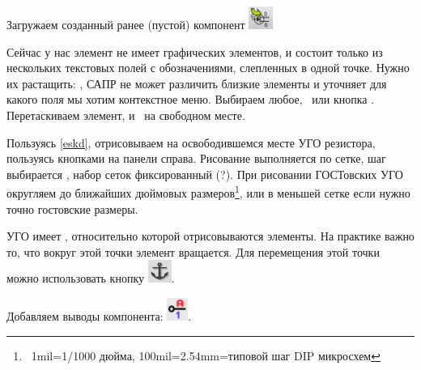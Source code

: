 Загружаем созданный ранее (пустой) компонент 
 \includegraphics[height=2em]{kicad/editel.png}


Сейчас у нас элемент не имеет графических элементов, и состоит только из
нескольких текстовых полей с обозначениями, слепленных в одной точке. Нужно их
растащить: \rms, САПР не может различить близкие элементы и уточняет для
какого поля мы хотим контекстное меню. Выбираем любое, \
или кнопка . Перетаскиваем элемент, и \lms\ на свободном месте.

Пользуясь \ref{eskd}, отрисовываем на освободившемся месте УГО резистора,
пользуясь кнопками на панели справа. Рисование выполняется по сетке, шаг
выбирается \menu{\rms>Выбор сетки}, набор сеток фиксированный (?). При рисовании
ГОСТовских УГО округляем до ближайших дюймовых размеров\footnote{\ 1mil=1/1000
дюйма, 100mil=2.54mm=типовой шаг DIP микросхем}, или в меньшей сетке если нужно
точно гостовские размеры.

УГО имеет , относительно которой отрисовываются элементы.
На практике важно то, что вокруг этой точки элемент вращается. Для перемещения
этой точки можно использовать кнопку \includegraphics[height=2em]{kicad/lib27.png}.

Добавляем выводы компонента: \includegraphics[height=2em]{kicad/lib28.png}.


\bigskip








\bigskip

